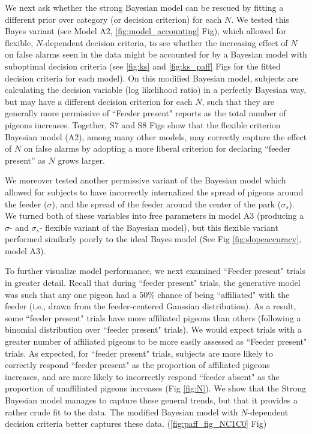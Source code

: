 \documentclass{article}
\begin{document}
We next ask whether the strong Bayesian model can be rescued by fitting a different prior over category (or decision criterion) for each $N$. We tested this Bayes variant (see Model A2, \ref{fig:model_accounting} Fig), which allowed for flexible, $N$-dependent decision criteria, to see whether the increasing effect of $N$ on false alarms seen in the data might be accounted for by a Bayesian model with suboptimal decision criteria (see \ref{fig:ks} and \ref{fig:ks_paff} Figs for the fitted decision criteria for each model). On this modified Bayesian model, subjects are calculating the decision variable (log likelihood ratio) in a perfectly Bayesian way, but may have a different decision criterion for each $N$, such that they are generally more permissive of ``Feeder present" reports as the total number of pigeons increases. Together, S7 and S8 Figs show that the flexible criterion Bayesian model (A2), among many other models, may correctly capture the effect of $N$ on false alarms by adopting a more liberal criterion for declaring ``feeder present” as $N$ grows larger.

We moreover tested another permissive variant of the Bayesian model which allowed for subjects to have incorrectly internalized the spread of pigeons around the feeder ($\sigma$), and the spread of the feeder around the center of the park ($\sigma_s$). We turned both of these variables into free parameters in model A3 (producing a $\sigma$- and $\sigma_s$- flexible variant of the Bayesian model), but this flexible variant performed similarly poorly to the ideal Bayes model (See Fig \ref{fig:slopeaccuracy}, model A3).

To further visualize model performance, we next examined ``Feeder present" trials in greater detail. Recall that during ``feeder present" trials, the generative model was such that any one pigeon had a 50\% chance of being ``affiliated" with the feeder (i.e., drawn from the feeder-centered Gaussian distribution). As a result, some ``feeder present" trials have more affiliated pigeons than others (following a binomial distribution over ``feeder present" trials). We would expect trials with a greater number of affiliated pigeons to be more easily assessed as ``Feeder present" trials. As expected, for ``feeder present" trials, subjects are more likely to correctly respond ``feeder present" as the proportion of affiliated pigeons increases, and are more likely to incorrectly respond ``feeder absent" as the proportion of unaffiliated pigeons increases (Fig \ref{fig:N}). We show that the Strong Bayesian model manages to capture these general trends, but that it provides a rather crude fit to the data. The modified Bayesian model with $N$-dependent decision criteria better captures these data. (\ref{fig:paff_fig_NC1C0} Fig)
\end{document}
